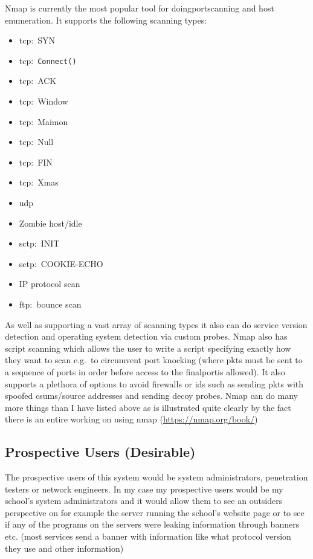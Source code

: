 \documentclass[titlepage]{article}
\let\Oldsubsection\subsection{}
\renewcommand{\subsection}{\FloatBarrier\Oldsubsection}
\begin{document}
Nmap is currently the most popular tool for doing\gls{port}scanning and host enumeration.
It supports the following scanning types:

\begin{itemize}
\item{\gls{tcp}:\ SYN}
\item{\gls{tcp}:\ \verb|Connect()|}
\item{\gls{tcp}:\ ACK}
\item{\gls{tcp}:\ Window}
\item{\gls{tcp}:\ Maimon}
\item{\gls{tcp}:\ Null}
\item{\gls{tcp}:\ FIN}
\item{\gls{tcp}:\ Xmas}
\item{\gls{udp}}
\item{Zombie host/idle}
\item{\gls{sctp}:\ INIT}
\item{\gls{sctp}:\ COOKIE-ECHO}
\item{IP protocol scan}
\item{\gls{ftp}:\ bounce scan}
\end{itemize}

As well as supporting a vast array of scanning types it also can do service version detection
and operating system detection via custom probes. Nmap also has script scanning which allows
the user to write a script specifying exactly how they want to scan e.g.\ to circumvent \gls{port knocking}
(where \glspl{pkt} must be sent to a sequence of \glspl{port} in order before access to the final\gls{port}is allowed).
It also supports a plethora of options to avoid firewalls or \gls{ids} such as sending
\glspl{pkt} with spoofed \glspl{csum}/source addresses and sending decoy probes. Nmap can do many more things than I
have listed above as is illustrated quite clearly by the fact there is an entire working on using nmap
(\href{https://nmap.org/book/}{https://nmap.org/book/})

\subsection{Prospective Users (Desirable)}

The prospective users of this system would be system administrators, penetration testers or network engineers.
In my case my prospective users would be my school's system administrators and it would allow them to see an
outsiders perspective on for example the \gls{server} running the school's website page or to see if any of the
programs on the \glspl{server} were leaking information through \glspl{banner} etc. (most services send a \gls{banner} with
information like what protocol version they use and other information)
\end{document}
